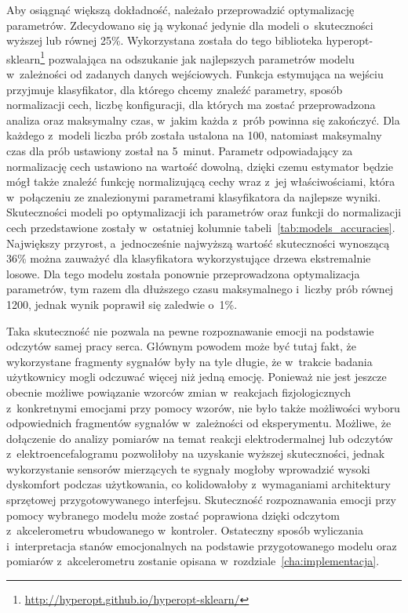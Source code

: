 Aby osiągnąć większą dokładność, należało przeprowadzić optymalizację parametrów. Zdecydowano się ją wykonać jedynie dla modeli o~skuteczności wyższej lub równej 25\%. Wykorzystana została do tego biblioteka hyperopt-sklearn\footnote{\url{http://hyperopt.github.io/hyperopt-sklearn/}} pozwalająca na odszukanie jak najlepszych parametrów modelu w~zależności od zadanych danych wejściowych. Funkcja estymująca na wejściu przyjmuje klasyfikator, dla którego chcemy znaleźć parametry, sposób normalizacji cech, liczbę konfiguracji, dla których ma zostać przeprowadzona analiza oraz maksymalny czas, w~jakim każda z~prób powinna się zakończyć. Dla każdego z~modeli liczba prób została ustalona na 100, natomiast maksymalny czas dla prób ustawiony został na 5~minut. Parametr odpowiadający za normalizację cech ustawiono na wartość dowolną, dzięki czemu estymator będzie mógł także znaleźć funkcję normalizującą cechy wraz z~jej właściwościami, która w~połączeniu ze znalezionymi parametrami klasyfikatora da najlepsze wyniki. Skuteczności modeli po optymalizacji ich parametrów oraz funkcji do normalizacji cech przedstawione zostały w~ostatniej kolumnie tabeli~\ref{tab:models_accuracies}. Największy przyrost, a~jednocześnie najwyższą wartość skuteczności wynoszącą 36\% można zauważyć dla klasyfikatora wykorzystujące drzewa ekstremalnie losowe. Dla tego modelu została ponownie przeprowadzona optymalizacja parametrów, tym razem dla dłuższego czasu maksymalnego i~liczby prób równej 1200, jednak wynik poprawił się zaledwie o~1\%. 

Taka skuteczność nie pozwala na pewne rozpoznawanie emocji na podstawie odczytów samej pracy serca. Głównym powodem może być tutaj fakt, że wykorzystane fragmenty sygnałów były na tyle długie, że w~trakcie badania użytkownicy mogli odczuwać więcej niż jedną emocję. Ponieważ nie jest jeszcze obecnie możliwe powiązanie wzorców zmian w~reakcjach fizjologicznych z~konkretnymi emocjami przy pomocy wzorów, nie było także możliwości wyboru odpowiednich fragmentów sygnałów w~zależności od eksperymentu. Możliwe, że dołączenie do analizy pomiarów na temat reakcji elektrodermalnej lub odczytów z~elektroencefalogramu pozwoliłoby na uzyskanie wyższej skuteczności, jednak wykorzystanie sensorów mierzących te sygnały mogłoby wprowadzić wysoki dyskomfort podczas użytkowania, co kolidowałoby z~wymaganiami architektury sprzętowej przygotowywanego interfejsu. Skuteczność rozpoznawania emocji przy pomocy wybranego modelu może zostać poprawiona dzięki odczytom z~akcelerometru wbudowanego w~kontroler. Ostateczny sposób wyliczania i~interpretacja stanów emocjonalnych na podstawie przygotowanego modelu oraz pomiarów z~akcelerometru zostanie opisana w~rozdziale~\ref{cha:implementacja}.